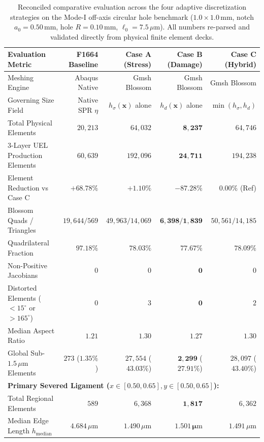 \begin{table}[htbp]
\centering
\caption{Reconciled comparative evaluation across the four adaptive discretization strategies on the Mode-I off-axis circular hole benchmark ($1.0 \times 1.0\,\mathrm{mm}$, notch $a_0 = 0.50\,\mathrm{mm}$, hole $R = 0.10\,\mathrm{mm}$, $\ell_0 = 7.5\,\mu\mathrm{m}$). All numbers re-parsed and validated directly from physical finite element decks.}
\label{tab:three_way_comparison_metrics}
\small
\begin{tabularx}{\textwidth}{p{}rrrr}
\toprule
\textbf{Evaluation Metric} & \textbf{F1664 Baseline} & \textbf{Case A (Stress)} & \textbf{Case B (Damage)} & \textbf{Case C (Hybrid)} \\
\midrule
Meshing Engine & Abaqus Native & Gmsh Blossom & Gmsh Blossom & Gmsh Blossom \\
Governing Size Field & Native SPR $\eta$ & $h_\sigma(\mathbf{x})$ alone & $h_d(\mathbf{x})$ alone & $\min(h_\sigma, h_d)$ \\
Total Physical Elements & $20{,}213$ & $64{,}032$ & $\mathbf{8{,}237}$ & $64{,}746$ \\
3-Layer UEL Production Elements & $60{,}639$ & $192{,}096$ & $\mathbf{24{,}711}$ & $194{,}238$ \\
Element Reduction vs Case C & $+68.78\%$ & $+1.10\%$ & $\mathbf{-87.28\%}$ & $0.00\%$ (Ref) \\
Blossom Quads / Triangles & $19{,}644 / 569$ & $49{,}963 / 14{,}069$ & $\mathbf{6{,}398 / 1{,}839}$ & $50{,}561 / 14{,}185$ \\
Quadrilateral Fraction & $97.18\%$ & $78.03\%$ & $\mathbf{77.67\%}$ & $78.09\%$ \\
Non-Positive Jacobians & $0$ & $0$ & $\mathbf{0}$ & $0$ \\
Distorted Elements ($<15^\circ$ or $>165^\circ$) & $0$ & $3$ & $\mathbf{0}$ & $2$ \\
Median Aspect Ratio & $1.21$ & $1.30$ & $\mathbf{1.27}$ & $1.30$ \\
Global Sub-$1.5\,\mu\mathrm{m}$ Elements & $273$ ($1.35\%$) & $27{,}554$ ($43.03\%$) & $\mathbf{2{,}299}$ ($27.91\%$) & $28{,}097$ ($43.40\%$) \\
\midrule
\multicolumn{5}{l}{\textbf{Primary Severed Ligament ($x \in [0.50, 0.65], y \in [0.50, 0.65]$):}} \\
Total Regional Elements & $589$ & $6{,}368$ & $\mathbf{1{,}817}$ & $6{,}362$ \\
Median Edge Length $h_{\text{median}}$ & $4.684\,\mu\mathrm{m}$ & $1.490\,\mu\mathrm{m}$ & $\mathbf{1.501\,\mu\mathrm{m}}$ & $1.491\,\mu\mathrm{m}$ \\

\end{tabularx}
\end{table}
